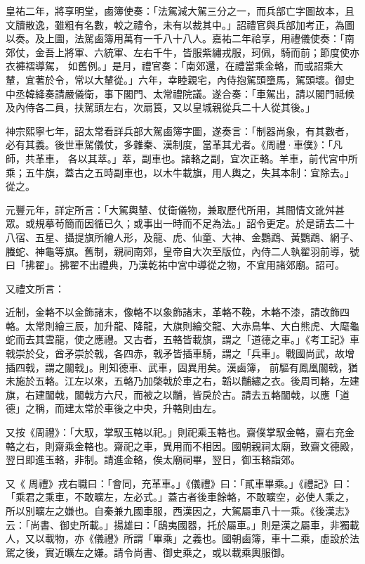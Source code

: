 \begin{pinyinscope}
 皇祐二年，將享明堂，鹵簿使奏：「法駕減大駕三分之一，而兵部亡字圖故本，且文牘散逸，雖粗有名數，較之禮令，未有以裁其中。」詔禮官與兵部加考正，為圖以奏。及上圖，法駕鹵簿用萬有一千八十八人。嘉祐二年祫享，用禮儀使奏：「南郊仗，金吾上將軍、六統軍、左右千牛，皆服紫繡戎服，珂佩，騎而前；節度使亦衣褲褶導駕，
 如舊例。」是月，禮官奏：「南郊還，在禮當乘金輅，而或詔乘大輦，宜著於令，常以大輦從。」六年，幸睦親宅，內侍抱駕頭墮馬，駕頭壞。御史中丞韓絳奏請嚴儀衛，事下閣門、太常禮院議。遂合奏：「車駕出，請以閣門祗候及內侍各二員，扶駕頭左右，次扇筤，又以皇城親從兵二十人從其後。」



 神宗熙寧七年，詔太常看詳兵部大駕鹵簿字圖，遂奏言：「制器尚象，有其數者，必有其義。後世車駕儀仗，多雜秦、漢制度，當革其尤者。《周禮·車僕》：「凡師，共革車，
 各以其萃。」萃，副車也。諸輅之副，宜次正輅。羊車，前代宮中所乘；五牛旗，蓋古之五時副車也，以木牛載旗，用人輿之，失其本制：宜除去。」從之。



 元豐元年，詳定所言：「大駕輿輦、仗衛儀物，兼取歷代所用，其間情文訛舛甚眾。或規摹茍簡而因循已久；或事出一時而不足為法。」詔令更定。於是請去二十八宿、五星、攝提旗所繪人形，及龍、虎、仙童、大神、金鸚鵡、黃鸚鵡、網子、螣蛇、神龜等旗。舊制，親祠南郊，皇帝自大次至版位，內侍二人執翟羽前導，號
 曰「拂翟」。拂翟不出禮典，乃漢乾祐中宮中導從之物，不宜用諸郊廟。詔可。



 又禮文所言：



 近制，金輅不以金飾諸末，像輅不以象飾諸末，革輅不鞔，木輅不漆，請改飾四輅。太常則繪三辰，加升龍、降龍，大旗則繪交龍、大赤鳥隼、大白熊虎、大麾龜蛇而去其雲龍，使之應禮。又古者，五輅皆載旗，謂之「道德之車。」《考工記》車戟崇於殳，酋矛崇於戟，各四赤，戟矛皆插車騎，謂之「兵車」。戰國尚武，故增插四戟，謂之闟戟」。則知德車、武車，固異用矣。漢鹵簿，
 前驅有鳳凰闟戟，猶未施於五輅。江左以來，五輅乃加棨戟於車之右，韜以黼繡之衣。後周司輅，左建旗，右建闟戟，闟戟方六尺，而被之以黼，皆戾於古。請去五輅闟戟，以應「道德」之稱，而建太常於車後之中央，升輅則由左。



 又按《周禮》：「大馭，掌馭玉輅以祀。」則祀乘玉輅也。齋僕掌馭金輅，齋右充金輅之右，則齋乘金輅也。齋祀之車，異用而不相因。國朝親祠太廟，致齋文德殿，翌日即進玉輅，非制。請進金輅，俟太廟祠畢，翌日，御玉輅詣郊。



 又《
 周禮》戎右職曰：「會同，充革車。」《儀禮》曰：「貳車畢乘。」《禮記》曰：「乘君之乘車，不敢曠左，左必式。」蓋古者後車餘輅，不敢曠空，必使人乘之，所以別曠左之嫌也。自秦兼九國車服，西漢因之，大駕屬車八十一乘。《後漢志》云：「尚書、御史所載。」揚雄曰：「鴟夷國器，托於屬車。」則是漢之屬車，非獨載人，又以載物，亦《儀禮》所謂「畢乘」之義也。國朝鹵簿，車十二乘，虛設於法駕之後，實近曠左之嫌。請令尚書、御史乘之，或以載乘輿服御。




\end{pinyinscope}
